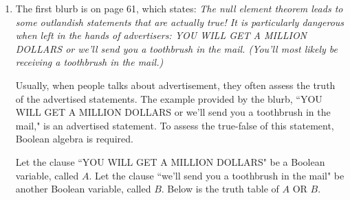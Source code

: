 \documentclass[12pt]{article}
\begin{document}
\begin{enumerate}
    \item The first blurb is on page 61, which states: \textit{The null element theorem leads to some outlandish statements that are actually true! It is particularly dangerous when left in the hands of advertisers: YOU WILL GET A MILLION DOLLARS or we'll send you a toothbrush in the mail. (You'll most likely be receiving a toothbrush in the mail.)}

    Usually, when people talks about advertisement, they often assess the truth of the advertised statements. The example provided by the blurb, ``YOU WILL GET A MILLION DOLLARS or we'll send you a toothbrush in the mail," is an advertised statement. To assess the true-false of this statement, Boolean algebra is required.

    Let the clause ``YOU WILL GET A MILLION DOLLARS" be a Boolean variable, called $A$. Let the clause ``we'll send you a toothbrush in the mail" be another Boolean variable, called $B$. Below is the truth table of $A\text{ OR }B$.


\end{enumerate}
\end{document}
